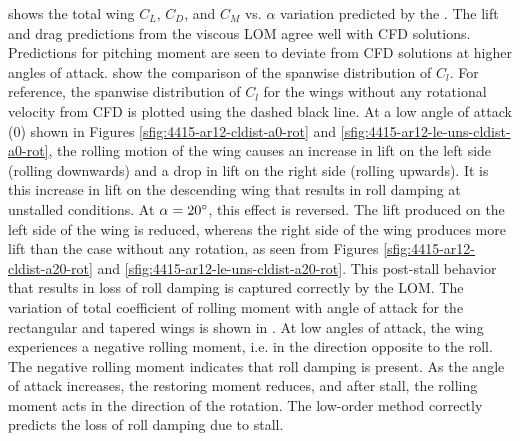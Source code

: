 shows the total wing $C_L$, $C_D$, and $C_M$ vs. $\alpha$ variation predicted by the \methodname. The lift and drag predictions from the viscous LOM agree well with CFD solutions. Predictions for pitching moment are seen to deviate from CFD solutions at higher angles of attack.
 show the comparison of the spanwise distribution of $C_l$.
For reference, the spanwise distribution of $C_l$ for the wings without any rotational velocity from CFD is plotted using the dashed black line.
At a low angle of attack (0\degree) shown in Figures \ref{sfig:4415-ar12-cldist-a0-rot} and \ref{sfig:4415-ar12-le-uns-cldist-a0-rot}, the rolling motion of the wing causes an increase in lift on the left side (rolling downwards) and a drop in lift on the right side (rolling upwards).
It is this increase in lift on the descending wing that results in roll damping at unstalled conditions.
At $\alpha=20^\circ{}$, this effect is reversed. The lift produced on the left side of the wing is reduced, whereas the right side of the wing produces more lift than the case without any rotation, as seen from Figures \ref{sfig:4415-ar12-cldist-a20-rot} and \ref{sfig:4415-ar12-le-uns-cldist-a20-rot}.
This post-stall behavior that results in loss of roll damping is captured correctly by the LOM.
The variation of total coefficient of rolling moment with angle of attack for the rectangular and tapered wings is shown in .
At low angles of attack, the wing experiences a negative rolling moment, i.e. in the direction opposite to the roll. The negative rolling moment indicates that roll damping is present. As the angle of attack increases, the restoring moment reduces, and after stall, the rolling moment acts in the direction of the rotation. The low-order method correctly predicts the loss of roll damping due to stall.

\begin{figure*}
    \centering
        \texttt{[image: \{figs/eps\_fig/naca4415\_coeffs\_roll\_all]}.eps}
    \caption{Total coefficients of lift, drag, and pitching moment for the NACA4415 $\ar{12}$ wings (Cases E\textsubscript{1}--E\textsubscript{2}) experiencing a $0.1\si{\radian\per\second}$ roll-rate}
    \label{fig:n4415-rot-coeffs}
\end{figure*}


